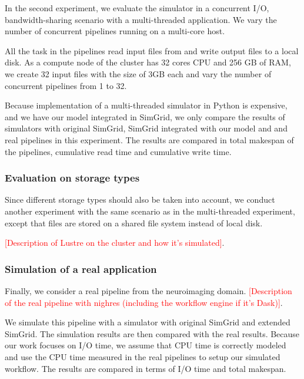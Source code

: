\documentclass[conference]{IEEEtran}
\begin{document}
			In the second experiment, we evaluate the simulator in a concurrent I/O, 
			bandwidth-sharing scenario with a multi-threaded application. 			
			We vary the number of concurrent pipelines running on a multi-core host.  
			
			All the task in the pipelines read input files from and write output files 
			to a local disk. 
			As a compute node of the cluster has 32 cores CPU and 256 GB of RAM,  
			we create 32 input files with the size of 3GB each and vary the number of 
			concurrent pipelines from 1 to 32. 
			
			Because implementation of a multi-threaded simulator  in Python is 
			expensive, and we have our model integrated in SimGrid, 
			we only compare the results of simulators with original SimGrid, 
			SimGrid integrated with our model and and real pipelines in this 
			experiment. The results are compared in total makespan of the pipelines, 
			cumulative read time and cumulative write time.
			
			\subsubsection{Evaluation on storage types}
			
		    Since different storage types should also be taken into account, 
		    we conduct another experiment with the same scenario as 
		    in the multi-threaded experiment, except that files are stored on a 
		    shared file system instead of local disk. 
		    
		    \textcolor{red}{[Description of Lustre on the cluster and how it's 
		    simulated]}. 
		    
		    \subsubsection{Simulation of a real application}

		    Finally, we consider a real pipeline from the neuroimaging domain. 			
			\textcolor{red}{[Description of the real pipeline with nighres 
			(including the workflow engine if it's Dask)]}.  			
			
			We simulate this pipeline with a simulator with original SimGrid and 
			extended SimGrid. 
			The simulation results are then compared with the real results. 
			Because our work focuses on I/O time, we assume that CPU time is 
			correctly modeled and use the CPU time measured in the real pipelines 
			to setup our simulated workflow. The results are compared in terms of 
			I/O time and total makespan.
\end{document}
